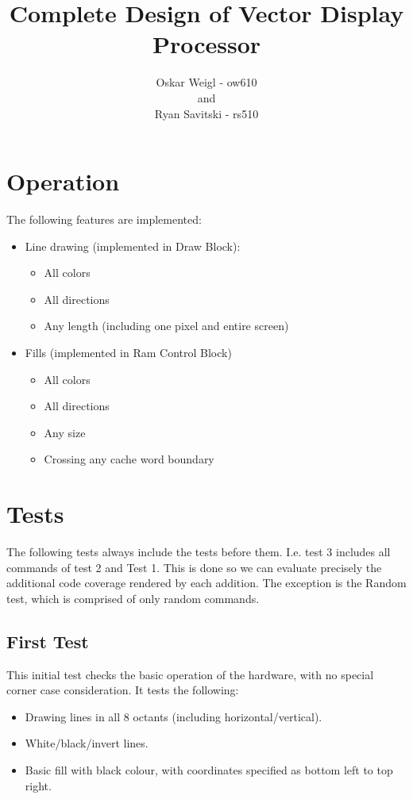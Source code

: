\documentclass[]{article}
\title{Complete Design of Vector Display Processor}
\author{Oskar Weigl - ow610\\ and \\ Ryan Savitski - rs510}
\begin{document}
\maketitle


\tableofcontents
\clearpage

\section{Operation}
The following features are implemented:
\begin{itemize}
	\item Line drawing (implemented in Draw Block):
	\begin{itemize}
		\item All colors
		\item All directions
		\item Any length (including one pixel and entire screen)
	\end{itemize}
	\item Fills (implemented in Ram Control Block)
	\begin{itemize}
		\item All colors
		\item All directions
		\item Any size
		\item Crossing any cache word boundary
	\end{itemize}
\end{itemize}

\section{Tests} %
\label{sec:tests}

The following tests always include the tests before them. I.e. test 3 includes all commands of test 2 and Test 1. This is done so we can evaluate precisely the additional code coverage rendered by each addition. The exception is the Random test, which is comprised of only random commands.

\subsection{First Test} %
\label{sub:first_test}

This initial test checks the basic operation of the hardware, with no special corner case consideration. It tests the following:
\begin{itemize}
	\item Drawing lines in all 8 octants (including horizontal/vertical).
	\item White/black/invert lines.
	\item Basic fill with black colour, with coordinates specified as bottom left to top right.
\end{itemize}
\end{document}

